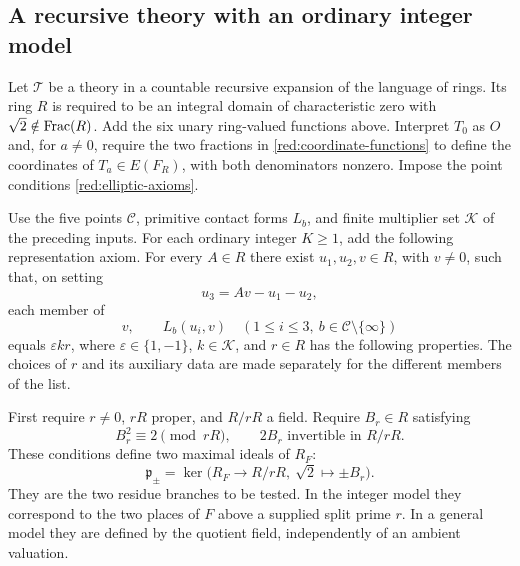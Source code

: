 \subsection{A recursive theory with an ordinary integer model}
\label{red:theory}

Let \(\mathcal T\) be a theory in a countable recursive expansion of
the language of rings. Its ring \(R\) is required to be an integral
domain of characteristic zero with \(\sqrt2\notin\operatorname{Frac}(R)\).
Add the six unary ring-valued functions above. Interpret \(T_0\) as
\(O\) and, for \(a\ne0\), require the two fractions in
\eqref{red:coordinate-functions} to define the coordinates of
\(T_a\in E(F_R)\), with both denominators nonzero. Impose the point
conditions \eqref{red:elliptic-axioms}.

Use the five points \(\mathcal C\), primitive contact forms \(L_b\), and
finite multiplier set \(\mathcal K\) of the preceding inputs. For each
ordinary integer \(K\ge1\), add the following representation axiom.
For every \(A\in R\) there exist \(u_1,u_2,v\in R\), with \(v\ne0\),
such that, on setting
\[
                            u_3=Av-u_1-u_2,
\]
each member of
\begin{equation}\label{red:contact-list}
 v,\qquad L_b(u_i,v)\quad
       (1\le i\le3,\ b\in\mathcal C\setminus\{\infty\})
\end{equation}
equals \(\varepsilon k r\), where
\(\varepsilon\in\{1,-1\}\), \(k\in\mathcal K\), and \(r\in R\)
has the following properties. The choices of \(r\) and its auxiliary
data are made separately for the different members of the list.

First require \(r\ne0\), \(rR\) proper, and \(R/rR\) a field.
Require \(B_r\in R\) satisfying
\[
 B_r^2\equiv2\pmod{rR},\qquad
 2B_r\text{ invertible in }R/rR.
\]
These conditions define two maximal ideals of \(R_F\):
\begin{equation}\label{red:branch-ideals}
 \mathfrak p_\pm
 =\ker\bigl(R_F\longrightarrow R/rR,\ \sqrt2\longmapsto\pm B_r\bigr).
\end{equation}
They are the two residue branches to be tested. In the integer model
they correspond to the two places of \(F\) above a supplied split
prime \(r\). In a general model they are defined by the quotient field,
independently of an ambient valuation.


